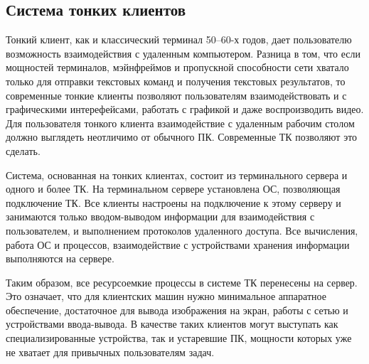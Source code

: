 \subsection{Система тонких клиентов}
Тонкий клиент, как и классический терминал 50–60-х годов, дает пользователю возможность
взаимодействия с удаленным компьютером. Разница в том, что если мощностей терминалов,
мэйнфреймов и пропускной способности сети хватало только для отправки текстовых команд и
получения текстовых результатов, то современные тонкие клиенты позволяют пользователям
взаимодействовать и с графическими интерефейсами, работать с графикой и даже
воспроизводить видео. Для пользователя тонкого клиента взаимодействие с удаленным
рабочим столом должно выглядеть неотличимо от обычного ПК. Современные ТК позволяют это
сделать.

Система, основанная на тонких клиентах, состоит из терминального сервера и одного и
более ТК. На терминальном сервере установлена ОС, позволяющая подключение ТК. Все
клиенты настроены на подключение к этому серверу и занимаются только вводом-выводом
информации для взаимодействия с пользователем, и выполнением протоколов удаленного
доступа. Все вычисления, работа ОС и процессов, взаимодействие с устройствами хранения
информации выполняются на сервере.

Таким образом, все ресурсоемкие процессы в системе ТК перенесены на сервер. Это
означает, что для клиентских машин нужно минимальное аппаратное обеспечение, достаточное
для вывода изображения на экран, работы с сетью и устройствами ввода-вывода. В качестве
таких клиентов могут выступать как специализированные устройства, так и устаревшие ПК,
мощности которых уже не хватает для привычных пользователям задач.

